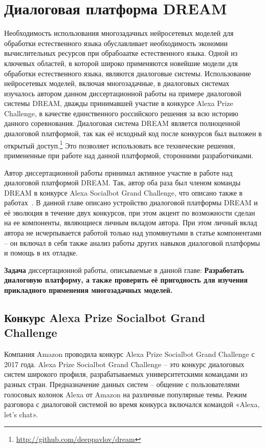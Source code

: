 
\chapter{Диалоговая платформа DREAM}\label{ch:dream} 
Необходимость использования многозадачных нейросетевых моделей для обработки естественного языка обуславливает необходимость экономии вычислительных ресурсов при обрабоаатке естественного языка. Одной из ключевых областей, в которой широко применяются новейшие модели для обработки естественного языка, являются диалоговые системы.  Использование нейросетевых моделей, включая многозадачные, в диалоговых системах изучалось автором данном диссертационной работы на примере диалоговой системы DREAM, дважды принимавшей участие в конкурсе Alexa Prize Challenge, в качестве единственного российского решения за всю историю данного соревнования. Диалоговая система {DREAM} является полноценной диалоговой платформой, так как её исходный код после конкурсов был выложен в открытый доступ.\footnote{\url{http://github.com/deeppavlov/dream}} Это позволяет использовать все технические решения, примененные при работе над данной платформой, сторонними разработчиками.

Автор диссертационной работы принимал активное участие в работе над диалоговой платформой DREAM. Так, автор оба раза был членом команды {DREAM} в конкурсе Alexa Socialbot Grand Challenge, что описано также в работах~\cite{dream1,dream1_trudy,dream2}. В данной главе описано устройство диалоговой платформы {DREAM} и её эволюция в течение двух конкурсов, при этом акцент по возможности сделан на ее компоненты, являющиеся личным вкладом автора. При этом личный вклад автора не исчерпывается работой только над упомянутыми в статье компонентами -- он включал в себя также анализ работы других навыков диалоговой платформы и помощь в их отладке.

\textbf{Задача} диссертационной работы, описываемые в данной главе: \textbf{Разработать диалоговую платформу, а также проверить её пригодность для изучения прикладного применения многозадачных моделей.}

\section{Конкурс Alexa Prize Socialbot Grand Challenge}

Компания Amazon проводила конкурс Alexa Prize Socialbot Grand Challenge с 2017 года. Alexa Prize Socialbot Grand Challenge -- это конкурс диалоговых систем широкого профиля, разрабатываемых университетскими командами из разных стран. Предназначение данных систем -- общение с пользователями голосовых колонок Alexa от Amazon на различные популярные темы. Режим разговора с диалоговой системой во время конкурса включался командой «Alexa, let’s chat».


